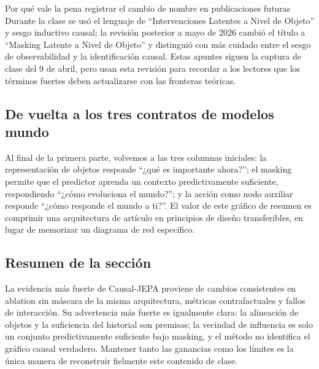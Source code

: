 

\begin{importantbox}{Por qué vale la pena registrar el cambio de nombre en publicaciones futuras}
Durante la clase se usó el lenguaje de ``Intervenciones Latentes a Nivel de Objeto'' y sesgo inductivo causal; la revisión posterior a mayo de 2026 cambió el título a ``Masking Latente a Nivel de Objeto'' y distinguió con más cuidado entre el sesgo de observabilidad y la identificación causal. Estas apuntes siguen la captura de clase del 9 de abril, pero usan esta revisión para recordar a los lectores que los términos fuertes deben actualizarse con las fronteras teóricas.
\end{importantbox}

\subsection{De vuelta a los tres contratos de modelos mundo}

Al final de la primera parte, volvemos a las tres columnas iniciales: la representación de objetos responde ``¿qué es importante ahora?''; el masking permite que el predictor aprenda un contexto predictivamente suficiente, respondiendo ``¿cómo evoluciona el mundo?''; y la acción como nodo auxiliar responde ``¿cómo responde el mundo a ti?''. El valor de este gráfico de resumen es comprimir una arquitectura de artículo en principios de diseño transferibles, en lugar de memorizar un diagrama de red específico.



\subsection{Resumen de la sección}

La evidencia más fuerte de Causal-JEPA proviene de cambios consistentes en ablation sin máscara de la misma arquitectura, métricas contrafactuales y fallos de interacción. Su advertencia más fuerte es igualmente clara: la alineación de objetos y la suficiencia del historial son premisas; la vecindad de influencia es solo un conjunto predictivamente suficiente bajo masking, y el método no identifica el gráfico causal verdadero. Mantener tanto las ganancias como los límites es la única manera de reconstruir fielmente este contenido de clase.
